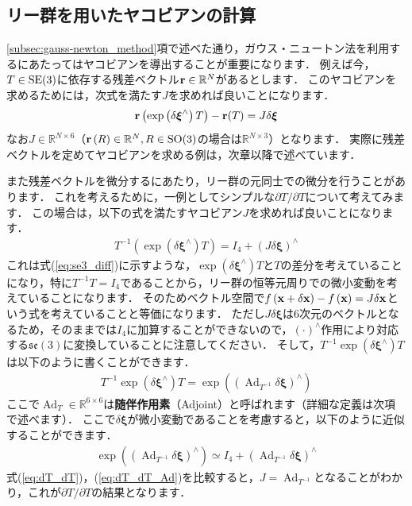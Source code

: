 \subsection{リー群を用いたヤコビアンの計算}

\ref{subsec:gauss-newton_method}項で述べた通り，ガウス・ニュートン法を利用するにあたってはヤコビアンを導出することが重要になります．
例えば今，$T \in {\rm SE}(3)$に依存する残差ベクトル${\bf r} \in \mathbb{R}^{N}$があるとします．
このヤコビアンを求めるためには，次式を満たす$J$を求めれば良いことになります．
%
\begin{align}
  {\bf r} \left( \exp \left( \delta \boldsymbol \xi^{\wedge} \right) T \right) - {\bf r}(T)
= J \delta \boldsymbol \xi
\end{align}
%
なお$J \in \mathbb{R}^{N \times 6}$（${\bf r}\left( R \right) \in \mathbb{R}^{N}, R \in {\rm SO}(3)$の場合は$\mathbb{R}^{N \times 3}$）となります．
実際に残差ベクトルを定めてヤコビアンを求める例は，次章以降で述べています．

また残差ベクトルを微分するにあたり，リー群の元同士での微分を行うことがあります．
これを考えるために，一例としてシンプルな$\partial T / \partial T$について考えてみます．
この場合は，以下の式を満たすヤコビアン$J$を求めれば良いことになります．
%
\begin{align}
  T^{-1} \left( \exp \left( \delta \boldsymbol \xi^{\wedge} \right) T \right) = I_{4} + \left( J \delta \boldsymbol \xi \right)^{\wedge}
  \label{eq:dT_dT}
\end{align}
%
これは式(\ref{eq:se3_diff})に示すような，$\exp \left( \delta \boldsymbol \xi^{\wedge} \right) T$と$T$の差分を考えていることになり，特に$T^{-1} T = I_{4}$であることから，リー群の恒等元周りでの微小変動を考えていることになります．
そのためベクトル空間で$f \left( {\bf x} + \delta {\bf x} \right) - f \left( {\bf x} \right) = J \delta {\bf x}$という式を考えていることと等価になります．
ただし$J \delta \boldsymbol \xi$は6次元のベクトルとなるため，そのままでは$I_{4}$に加算することができないので，$\left( \cdot \right)^{\wedge}$作用により対応する$\mathfrak{se}(3)$に変換していることに注意してください．
そして，$T^{-1} \exp \left( \delta \boldsymbol \xi^{\wedge} \right) T$は以下のように書くことができます．
%
\begin{align}
  T^{-1} \exp \left( \delta \boldsymbol \xi^{\wedge} \right) T = \exp \left( \left( \operatorname{Ad}_{T^{-1}} \delta \boldsymbol \xi \right)^{\wedge} \right)
\end{align}
%
ここで$\operatorname{Ad}_{T} \in \mathbb{R}^{6 \times 6}$は{\bf 随伴作用素}（Adjoint）と呼ばれます（詳細な定義は次項で述べます）．
ここで$\delta \boldsymbol \xi$が微小変動であることを考慮すると，以下のように近似することができます．
%
\begin{align}
  \exp \left( \left( \operatorname{Ad}_{T^{-1}} \delta \boldsymbol \xi \right)^{\wedge} \right) \simeq I_{4} + \left( \operatorname{Ad}_{T^{-1}} \delta \boldsymbol \xi \right)^{\wedge}
  \label{eq:dT_dT_Ad}
\end{align}
%
式(\ref{eq:dT_dT})，(\ref{eq:dT_dT_Ad})を比較すると，$J = \operatorname{Ad}_{T^{-1}}$となることがわかり，これが$\partial T / \partial T$の結果となります．







